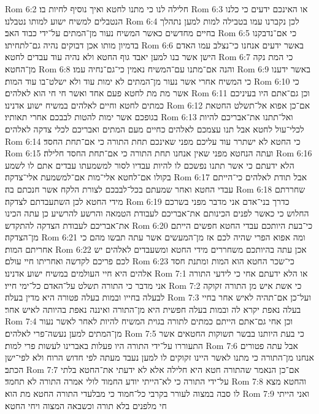 Rom 6:2  חלילה לנו כי מתנו לחטא ואיך נוסיף לחיות בו׃
Rom 6:3  או האינכם ידעים כי כלנו הנטבלים למשיח ישוע למותו נטבלנו׃
Rom 6:4  לכן נקברנו עמו בטבילה למות למען נתהלך בחיים מחדשים כאשר המשיח נעור מן־המתים על־ידי כבוד האב׃
Rom 6:5  כי אם־נדבקנו בדמיון מותו אכן דבוקים נהיה גם־לתחיתו׃
Rom 6:6  באשר ידעים אנחנו כי־נצלב עמו האדם הישן אשר בנו למען יאבד גוף החטא ולא נהיה עוד עבדים לחטא׃
Rom 6:7  כי המת נקה מן־החטא׃
Rom 6:8  והנה אם־מתנו עם־המשיח נאמין כי־גם־נחיה עמו׃
Rom 6:9  באשר ידענו כי המשיח אחרי אשר נעור מן־המתים לא ימות עוד ולא ישלט־בו עוד המות׃
Rom 6:10  כי אשר מת מת לחטא פעם אחד ואשר חי חי הוא לאלהים׃
Rom 6:11  וכן גם־אתם היו בעיניכם כמתים לחטא וחיים לאלהים במשיח ישוע אדנינו׃
Rom 6:12  אם־כן אפוא אל־תשלט החטאת בגופכם אשר ימות להטות לבבכם אחרי תאותיו׃
Rom 6:13  ואל־תתנו את־אבריכם להיות לכלי־עול לחטא אבל תנו עצמכם לאלהים כחיים מעם המתים ואבריכם לכלי צדקה לאלהים׃
Rom 6:14  כי החטא לא ישתרר עוד עליכם מפני שאינכם תחת התורה כי אם־תחת החסד׃
Rom 6:15  ועתה הנחטא מפני שאין אנחנו תחת התורה כי אם־תחת החסד חלילה׃
Rom 6:16  הלא ידעתם כי אשר תתנו נפשכם לו להיות עבדיו לסור למשמעתו עבדים אתם לו לשמע בקולו אם־לחטא אלי־מות אם־למשמעת אלי־צדקה׃
Rom 6:17  אבל תודת לאלהים כי־הייתם עבדי החטא ואחר שמעתם בכל־לבבכם לצורת הלקח אשר חנכתם בה׃
Rom 6:18  שחררתם מידי החטא לכן השתעבדתם לצדקה׃
Rom 6:19  כדרך בני־אדם אני מדבר מפני בשרכם החלוש כי כאשר לפנים הכינותם את־אבריכם לעבודת הטמאה והרשע להרשיע כן עתה הכינו את־אבריכם לעבודת הצדקה להתקדש׃
Rom 6:20  כי־בעת היותכם עבדי החטא חפשים הייתם מן־הצדקה׃
Rom 6:21  ומה אפוא הפרי שהיה לכם אז מן־המעשים אשר עתה תבשו מהם כי אחריתם המות׃
Rom 6:22  אכן עתה בהיותכם משחררים מידי החטא ומשעבדים לאלהים יש לכם פריכם לקדשה ואחריתו חיי עולם׃
Rom 6:23  כי־שכר החטא הוא המות ומתנת חסד אלהים היא חיי העולמים במשיח ישוע אדנינו׃
Rom 7:1  או הלא ידעתם אחי כי לידעי התורה אני מדבר כי התורה תשלט על־האדם כל־ימי חייו׃
Rom 7:2  כי אשת איש מן התורה זקוקה לבעלה בחייו ובמות בעלה פטורה היא מדין בעלה׃
Rom 7:3  ועל־כן אם־תהיה לאיש אחר בחיי בעלה נאפת יקרא לה ובמות בעלה חפשית היא מן־התורה ואיננה נאפת בהיותה לאיש אחר׃
Rom 7:4  וכן אחי גם־אתם הייתם כמתים לתורה בגוית המשיח להיות לאחר לאשר נעור מן־המתים למען נעשה־פרי לאלהים׃
Rom 7:5  כי בעת היותנו בבשר תשוקות החטאים אשר התעוררו על־ידי התורה היו פעלות באברינו לעשות פרי למות׃
Rom 7:6  אבל עתה פטורים אנחנו מן־התורה כי מתנו לאשר היינו זקוקים לו למען נעבד מעתה לפי חדוש הרוח ולא לפי־ישן הכתב׃
Rom 7:7  אם־כן הנאמר שהתורה חטא היא חלילה אלא לא ידעתי את־החטא בלתי על־ידי התורה כי לא־הייתי יודע החמוד לולי אמרה התורה לא תחמד׃
Rom 7:8  והחטא מצא לו סבה במצוה לעורר בקרבי כל־חמוד כי מבלעדי התורה החטא מת הוא׃
Rom 7:9  ואני הייתי חי מלפנים בלא תורה וכשבאה המצוה ויחי החטא׃
